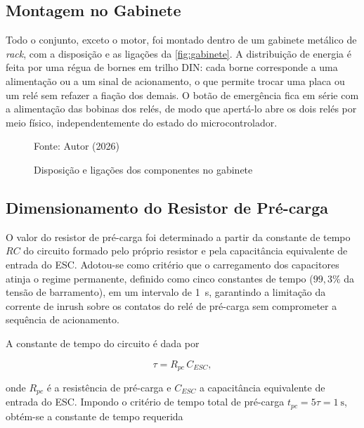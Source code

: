 \subsection{Montagem no Gabinete}
\label{sec:montagem_gabinete}

Todo o conjunto, exceto o motor, foi montado dentro de um gabinete metálico
de \textit{rack}, com a disposição e as ligações da \autoref{fig:gabinete}. A
distribuição de energia é feita por uma régua de bornes em trilho DIN: cada
borne corresponde a uma alimentação ou a um sinal de acionamento, o que permite
trocar uma placa ou um relé sem refazer a fiação dos demais. O botão de
emergência fica em série com a alimentação das bobinas dos relés, de modo que
apertá-lo abre os dois relés por meio físico, independentemente do estado do
microcontrolador.

\begin{figure}[H]
    \centering
    \caption{Disposição e ligações dos componentes no gabinete}
    \label{fig:gabinete}
    \resizebox{\textwidth}{!}{}

    Fonte: Autor (2026)
\end{figure}

\subsection{Dimensionamento do Resistor de Pré-carga}

O valor do resistor de pré-carga foi determinado a partir da constante de tempo
$RC$ do circuito formado pelo próprio resistor e pela capacitância equivalente
de entrada do ESC. Adotou-se como critério que o carregamento dos capacitores
atinja o regime permanente, definido como cinco constantes de tempo
($99{,}3\%$ da tensão de barramento), em um intervalo de \SI{1}{\second},
garantindo a limitação da corrente de inrush sobre os contatos do relé de
pré-carga sem comprometer a sequência de acionamento.

A constante de tempo do circuito é dada por

\begin{equation}
    \tau = R_{pc} \, C_{ESC},
    \label{eq:tau_precarga}
\end{equation}

\noindent onde $R_{pc}$ é a resistência de pré-carga e $C_{ESC}$ a capacitância
equivalente de entrada do ESC. Impondo o critério de tempo total de pré-carga
$t_{pc} = 5\tau = \SI{1}{\second}$, obtém-se a constante de tempo requerida

